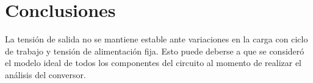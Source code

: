 \section{Conclusiones}

La tensión de salida no se mantiene estable ante variaciones en la carga con ciclo de trabajo y tensión de alimentación fija. 
Esto puede deberse a que se consideró el modelo ideal de todos los componentes del circuito al momento de realizar el análisis del conversor. 